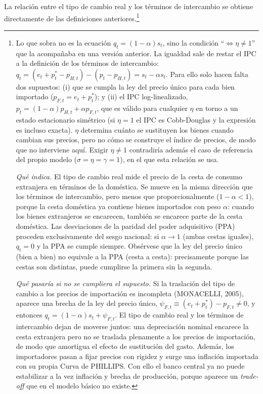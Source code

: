 \documentclass[10pt,a4paper]{article}
\begin{document}
La relación entre el tipo de cambio real y los términos de intercambio se obtiene directamente de las definiciones anteriores.\footnote{%
Lo que sobra no es la ecuación $q_t=(1-\alpha)s_t$, sino la condición ``$\iff\eta\neq1$'' que la acompañaba en una versión anterior. La igualdad sale de restar el IPC a la definición de los términos de intercambio: $q_t=(e_t+p_t^*-p_{H,t})-(p_t-p_{H,t})=s_t-\alpha s_t$. Para ello solo hacen falta dos supuestos: (i) que se cumpla la ley del precio único para cada bien importado ($p_{F,t}=e_t+p_t^*$); y (ii) el IPC log-linealizado, $p_t=(1-\alpha)p_{H,t}+\alpha p_{F,t}$, que es válido para cualquier $\eta$ en torno a un estado estacionario simétrico (si $\eta=1$ el IPC es Cobb-Douglas y la expresión es incluso exacta). $\eta$ determina cuánto se sustituyen los bienes cuando cambian sus precios, pero no cómo se construye el índice de precios, de modo que no interviene aquí. Exigir $\eta\neq1$ contradiría además el caso de referencia del propio modelo ($\sigma=\eta=\gamma=1$), en el que esta relación se usa.

\textit{Qué indica.} El tipo de cambio real mide el precio de la cesta de consumo extranjera en términos de la doméstica. Se mueve en la misma dirección que los términos de intercambio, pero menos que proporcionalmente ($1-\alpha<1$), porque la cesta doméstica ya contiene bienes importados con peso $\alpha$: cuando los bienes extranjeros se encarecen, también se encarece parte de la cesta doméstica. Las desviaciones de la paridad del poder adquisitivo (PPA) proceden exclusivamente del sesgo nacional: si $\alpha\to1$ (ambas cestas iguales), $q_t=0$ y la PPA se cumple siempre. Obsérvese que la ley del precio único (bien a bien) no equivale a la PPA (cesta a cesta): precisamente porque las cestas son distintas, puede cumplirse la primera sin la segunda.

\textit{Qué pasaría si no se cumpliera el supuesto.} Si la traslación del tipo de cambio a los precios de importación es incompleta (MONACELLI, 2005), aparece una brecha de la ley del precio único, $\psi_{F,t}\equiv(e_t+p_t^*)-p_{F,t}\neq0$, y entonces $q_t=(1-\alpha)s_t+\psi_{F,t}$. El tipo de cambio real y los términos de intercambio dejan de moverse juntos: una depreciación nominal encarece la cesta extranjera pero no se traslada plenamente a los precios de importación, de modo que amortigua el efecto de sustitución del gasto. Además, los importadores pasan a fijar precios con rigidez y surge una inflación importada con su propia Curva de PHILLIPS. Con ello el banco central ya no puede estabilizar a la vez inflación y brecha de producción, porque aparece un \textit{trade-off} que en el modelo básico no existe.
%
}
\end{document}

